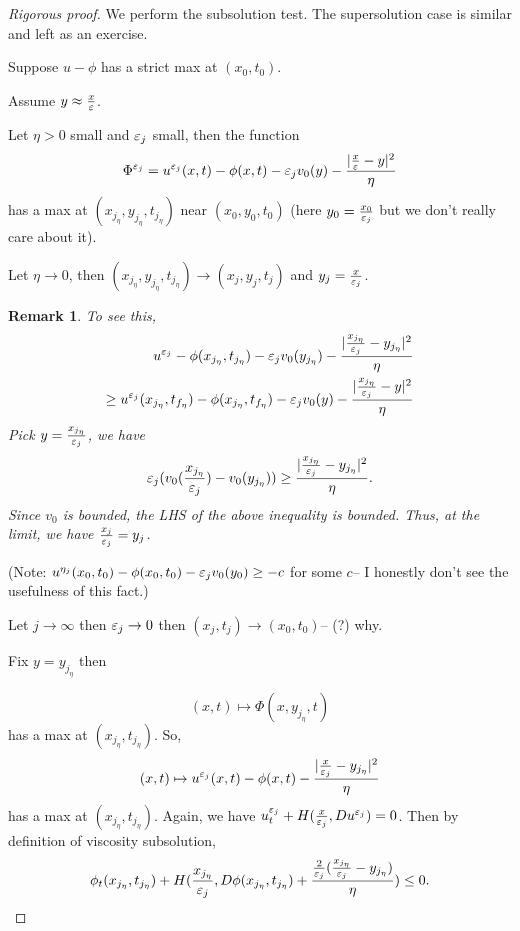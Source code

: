 \documentclass[11pt, oneside]{amsart}   	%
\newtheorem{remark}{Remark}
\begin{document}
\begin{proof}[Rigorous proof] We perform the subsolution test. The supersolution case is similar and left as an exercise.

	Suppose $u-\phi$ has a strict max at $(x_0, t_0)$.
	
	Assume $y\approx \frac{x}{\varepsilon}$.
	
	Let $\eta >0$ small and $\varepsilon_j$ small, then the function
	$$\Phi^{\varepsilon_j}=u^{\varepsilon_j}(x,t)- \phi(x,t) -\varepsilon_j v_0(y) - \frac{|\frac{x}{\varepsilon} - y|^2}{\eta}$$
	has a max at $(x_{j_\eta}, y_{j_\eta}, t_{j_\eta})$ near $(x_0, y_0, t_0)$ (here $y_0=\frac{x_0}{\varepsilon_j}$ but we don't really care about it).
	
	Let $\eta\to 0$, then $(x_{j_\eta}, y_{j_\eta}, t_{j_\eta})\to (x_j, y_j, t_j)$ and $y_j=\frac{x}{\varepsilon_j}$.
	\begin{remark}
	To see this,
	\begin{eqnarray*}
		u^{\varepsilon_j} - \phi(x_{j_\eta}, t_{j_\eta}) - \varepsilon_j v_0(y_{j_\eta}) - \frac{|\frac{x_{j_\eta}}{\varepsilon_j} - y_{j_\eta}|^2}{\eta}\\
		\ge u^{\varepsilon_j}(x_{j_\eta}, t_{f_\eta})- \phi(x_{j_\eta}, t_{f_\eta})-\varepsilon_j v_0(y)-\frac{|\frac{x_{j_\eta}}{\varepsilon_j} - y|^2}{\eta}
	\end{eqnarray*}
	Pick $y=\frac{x_{j_\eta}}{\varepsilon_j}$, we have
	$$\varepsilon_j(v_0(\frac{x_{j_\eta}}{\varepsilon_j})-v_0(y_{j_\eta}))\ge \frac{|\frac{x_{j_\eta}}{\varepsilon_j}-y_{j_\eta}|^2}{\eta}.$$
	Since $v_0$ is bounded, the LHS of the above inequality is bounded. Thus, at the limit, we have $\frac{x_j}{\varepsilon_j}=y_j$.
	\end{remark}
	
	(Note: $u^{\eta_j}(x_0, t_0) - \phi(x_0, t_0) - \varepsilon_j v_0(y_0) \ge -c$ for some $c$-- I honestly don't see the usefulness of this fact.)
	
	Let $j\to \infty$ then $\varepsilon_j\to 0$ then $(x_j, t_j)\to (x_0, t_0)$-- (?) why.
	
	Fix $y=y_{j_\eta}$ then
	
	$$(x,t)\mapsto \Phi(x, y_{j_\eta}, t)$$ has a max at $(x_{j_\eta}, t_{j_\eta})$.
	So, $$(x,t)\mapsto u^{\varepsilon_j}(x,t) - \phi(x,t) - \frac{|\frac{x}{\varepsilon_j} - y_{j_\eta}|^2}{\eta}$$ has a max at $(x_{j_\eta}, t_{j_\eta})$. Again, we have $u^{\varepsilon_j}_t + H(\frac{x}{\varepsilon_j}, Du^{\varepsilon_j})=0$. Then by definition of viscosity subsolution,
	$$\phi_t(x_{j_\eta}, t_{j_\eta})+ H(\frac{x_{j_\eta}}{\varepsilon_j}, D\phi(x_{j_\eta}, t_{j_\eta})+ \frac{\frac{2}{\varepsilon_j}(\frac{x_{j_\eta}}{\varepsilon_j} - y_{j_\eta})}{\eta})\le 0.$$
	

\end{proof}
\end{document}
